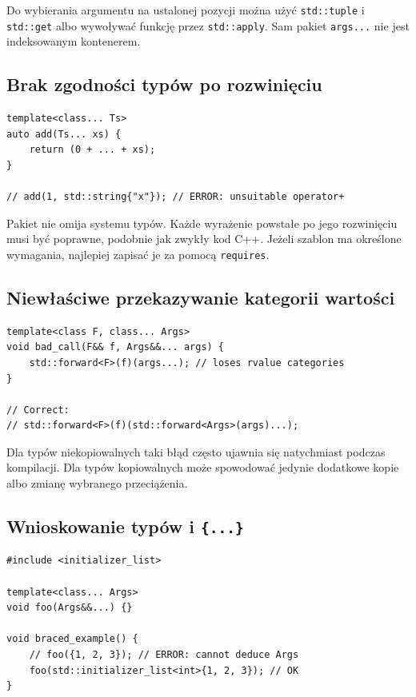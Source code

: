 Do wybierania argumentu na ustalonej pozycji można użyć
\texttt{std::tuple} i \texttt{std::get} albo wywoływać funkcję
przez \texttt{std::apply}. Sam pakiet \texttt{args...}
nie jest indeksowanym kontenerem.

\subsection{Brak zgodności typów po rozwinięciu}

\begin{lstlisting}
template<class... Ts>
auto add(Ts... xs) {
    return (0 + ... + xs);
}

// add(1, std::string{"x"}); // ERROR: unsuitable operator+
\end{lstlisting}

Pakiet nie omija systemu typów. Każde wyrażenie powstałe po
jego rozwinięciu musi być poprawne, podobnie jak zwykły kod
C++. Jeżeli szablon ma określone wymagania, najlepiej
zapisać je za pomocą \texttt{requires}.

\subsection{Niewłaściwe przekazywanie kategorii wartości}

\begin{lstlisting}
template<class F, class... Args>
void bad_call(F&& f, Args&&... args) {
    std::forward<F>(f)(args...); // loses rvalue categories
}

// Correct:
// std::forward<F>(f)(std::forward<Args>(args)...);
\end{lstlisting}

Dla typów niekopiowalnych taki błąd często ujawnia się
natychmiast podczas kompilacji. Dla typów kopiowalnych
może spowodować jedynie dodatkowe kopie albo zmianę
wybranego przeciążenia.

\subsection{Wnioskowanie typów i \texttt{\{...\}}}

\begin{lstlisting}
#include <initializer_list>

template<class... Args>
void foo(Args&&...) {}

void braced_example() {
    // foo({1, 2, 3}); // ERROR: cannot deduce Args
    foo(std::initializer_list<int>{1, 2, 3}); // OK
}
\end{lstlisting}

